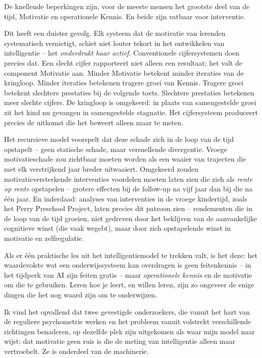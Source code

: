\documentclass[11pt, twoside, openright]{book}
\begin{document}
De knellende beperkingen zijn, voor de meeste mensen het grootste deel van de tijd, Motivatie en operationele Kennis. En beide zijn vatbaar voor interventie.

Dit heeft een duister gevolg. Elk systeem dat de motivatie van lerenden systematisch vernietigt, schiet niet louter tekort in het ontwikkelen van intelligentie -- het \textit{onderdrukt haar actief}. Conventionele cijfersystemen doen precies dat. Een slecht cijfer rapporteert niet alleen een resultaat; het valt de component Motivatie aan. Minder Motivatie betekent minder iteraties van de kringloop. Minder iteraties betekenen tragere groei van Kennis. Tragere groei betekent slechtere prestaties bij de volgende toets. Slechtere prestaties betekenen meer slechte cijfers. De kringloop is omgekeerd: in plaats van samengestelde groei zit het kind nu gevangen in samengestelde stagnatie. Het cijfersysteem produceert precies de uitkomst die het beweert alleen maar te meten.

Het recursieve model voorspelt dat deze schade zich in de loop van de tijd opstapelt -- geen statische schade, maar versnellende divergentie. Vroege motivatieschade zou zichtbaar moeten worden als een waaier van trajecten die met elk verstrijkend jaar breder uitwaaiert. Omgekeerd zouden motivatieversterkende interventies voordelen moeten laten zien die zich als \textit{rente op rente} opstapelen -- grotere effecten bij de follow-up na vijf jaar dan bij die na één jaar. En inderdaad: analyses van interventies in de vroege kindertijd, zoals het Perry Preschool Project, laten precies dit patroon zien -- rendementen die in de loop van de tijd groeien, niet gedreven door het beklijven van de aanvankelijke cognitieve winst (die vaak wegebt), maar door zich opstapelende winst in motivatie en zelfregulatie.

Als er één praktische les uit het intelligentiemodel te trekken valt, is het deze: het waardevolste wat een onderwijssysteem kan overdragen is geen feitenkennis -- in het tijdperk van AI zijn feiten gratis -- maar \textit{operationele kennis} en de motivatie om die te gebruiken. Leren hoe je leert, en willen leren, zijn zo ongeveer de enige dingen die het nog waard zijn om te onderwijzen.

Ik vind het opvallend dat twee gevestigde onderzoekers, die vanuit het hart van de reguliere psychometrie werken en het probleem vanuit volstrekt verschillende richtingen benaderen, op dezelfde plek zijn uitgekomen als waar mijn model naar wijst: dat motivatie geen ruis is die de meting van intelligentie alleen maar vertroebelt. Ze is onderdeel van de machinerie.
\end{document}
